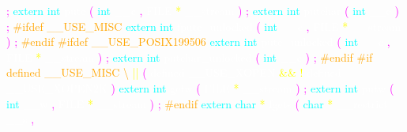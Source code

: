 \textcolor{magenta}{;} 
\textcolor{cyan}{extern} 
\textcolor{cyan}{int} 
\textcolor{white}{putc} 
\textcolor{magenta}{(} 
\textcolor{cyan}{int} 
\textcolor{white}{\_\_c} 
\textcolor{magenta}{,} 
\textcolor{white}{FILE} 
\textcolor{yellow}{*} 
\textcolor{white}{\_\_stream} 
\textcolor{magenta}{)} 
\textcolor{magenta}{;} 
\textcolor{cyan}{extern} 
\textcolor{cyan}{int} 
\textcolor{white}{putchar} 
\textcolor{magenta}{(} 
\textcolor{cyan}{int} 
\textcolor{white}{\_\_c} 
\textcolor{magenta}{)} 
\textcolor{magenta}{;} 
\textcolor{orange}{\#ifdef \_\_USE\_MISC} 
\textcolor{cyan}{extern} 
\textcolor{cyan}{int} 
\textcolor{white}{fputc\_unlocked} 
\textcolor{magenta}{(} 
\textcolor{cyan}{int} 
\textcolor{white}{\_\_c} 
\textcolor{magenta}{,} 
\textcolor{white}{FILE} 
\textcolor{yellow}{*} 
\textcolor{white}{\_\_stream} 
\textcolor{magenta}{)} 
\textcolor{magenta}{;} 
\textcolor{orange}{\#endif} 
\textcolor{orange}{\#ifdef \_\_USE\_POSIX199506} 
\textcolor{cyan}{extern} 
\textcolor{cyan}{int} 
\textcolor{white}{putc\_unlocked} 
\textcolor{magenta}{(} 
\textcolor{cyan}{int} 
\textcolor{white}{\_\_c} 
\textcolor{magenta}{,} 
\textcolor{white}{FILE} 
\textcolor{yellow}{*} 
\textcolor{white}{\_\_stream} 
\textcolor{magenta}{)} 
\textcolor{magenta}{;} 
\textcolor{cyan}{extern} 
\textcolor{cyan}{int} 
\textcolor{white}{putchar\_unlocked} 
\textcolor{magenta}{(} 
\textcolor{cyan}{int} 
\textcolor{white}{\_\_c} 
\textcolor{magenta}{)} 
\textcolor{magenta}{;} 
\textcolor{orange}{\#endif} 
\textcolor{orange}{\#if defined \_\_USE\_MISC \textbackslash } 
\textcolor{yellow}{||} 
\textcolor{magenta}{(} 
\textcolor{white}{defined} 
\textcolor{white}{\_\_USE\_XOPEN} 
\textcolor{yellow}{\&\&} 
\textcolor{yellow}{!} 
\textcolor{white}{defined} 
\textcolor{white}{\_\_USE\_XOPEN2K} 
\textcolor{magenta}{)} 
\textcolor{cyan}{extern} 
\textcolor{cyan}{int} 
\textcolor{white}{getw} 
\textcolor{magenta}{(} 
\textcolor{white}{FILE} 
\textcolor{yellow}{*} 
\textcolor{white}{\_\_stream} 
\textcolor{magenta}{)} 
\textcolor{magenta}{;} 
\textcolor{cyan}{extern} 
\textcolor{cyan}{int} 
\textcolor{white}{putw} 
\textcolor{magenta}{(} 
\textcolor{cyan}{int} 
\textcolor{white}{\_\_w} 
\textcolor{magenta}{,} 
\textcolor{white}{FILE} 
\textcolor{yellow}{*} 
\textcolor{white}{\_\_stream} 
\textcolor{magenta}{)} 
\textcolor{magenta}{;} 
\textcolor{orange}{\#endif} 
\textcolor{cyan}{extern} 
\textcolor{cyan}{char} 
\textcolor{yellow}{*} 
\textcolor{white}{fgets} 
\textcolor{magenta}{(} 
\textcolor{cyan}{char} 
\textcolor{yellow}{*} 
\textcolor{white}{\_\_restrict} 
\textcolor{white}{\_\_s} 
\textcolor{magenta}{,} 
